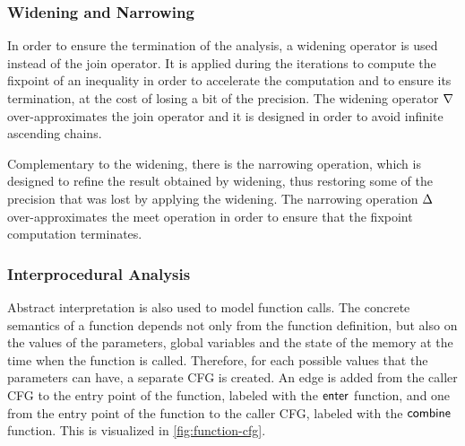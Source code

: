 \subsubsection{Widening and Narrowing}

In order to ensure the termination of the analysis, a widening operator is used instead of the
join operator. It is applied during the iterations to compute the fixpoint of an inequality
in order to accelerate the computation and to ensure its termination, at the cost of losing a bit of the precision.
The widening operator $\nabla$ over-approximates the join operator and it is designed in order to avoid infinite ascending chains.

Complementary to the widening, there is the narrowing operation, which is designed to
refine the result obtained by widening, thus restoring some of the precision that was lost by applying the widening.
The narrowing operation $\Delta$ over-approximates the meet operation in order to ensure that the fixpoint computation terminates.

\subsubsection{Interprocedural Analysis}

Abstract interpretation is also used to model function calls.
The concrete semantics of a function depends not only from the function definition, but also on the values of the parameters, global variables and the state of the memory at the time when the function is called.
Therefore, for each possible values that the parameters can have, a separate CFG is created.
An edge is added from the caller CFG to the entry point of the function, labeled with the $\textsf{enter}$ function, and one from the entry point
of the function to the caller CFG, labeled with the $\textsf{combine}$ function.
This is visualized in \cref{fig:function-cfg}.


